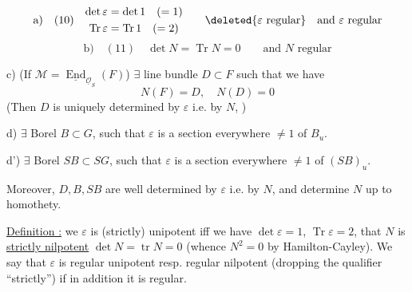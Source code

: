 \[
\text{a)}\quad (10)\quad
\begin{gathered}
\det\varepsilon=\det1\quad(=1)\\
\operatorname{Tr}\varepsilon=\operatorname{Tr}1\quad(=2)
\end{gathered}
\qquad \deleted{\varepsilon\text{ regular}}\quad\text{and }\varepsilon\text{ regular}
\]
\[
\text{b)}\quad (11)\quad \det N=\operatorname{Tr}N=0\qquad\text{and }N\text{ regular}
\]

c) (If $\mathcal M=\underline{\operatorname{End}}_{\underline{\mathcal O}_S}(F)$) $\exists$ line bundle $D\subset F$ such that we have
\[
N(F)=D,\quad N(D)=0
\]
(Then $D$ is uniquely determined by $\varepsilon$ i.e. by $N$,  )


d) $\exists$ Borel $B\subset G$, such that $\varepsilon$ is a section everywhere $\ne1$ of $B_u$.

d') $\exists$ Borel $SB\subset SG$, such that $\varepsilon$ is a section everywhere $\ne1$ of $(SB)_u$.

 Moreover, $D,B,SB$ are well determined by $\varepsilon$ i.e. by $N$, and determine $N$ up to homothety.

\uline{Definition :} we   $\varepsilon$ is (strictly) unipotent iff we have $\det\varepsilon=1$, $\operatorname{Tr}\varepsilon=2$, that $N$ is \uline{strictly nilpotent}  $\det N=\operatorname{tr}N=0$ (whence $N^2=0$ by Hamilton-Cayley). We say that $\varepsilon$ is regular unipotent resp. regular nilpotent (dropping the qualifier ``strictly'') if in addition it is regular.

